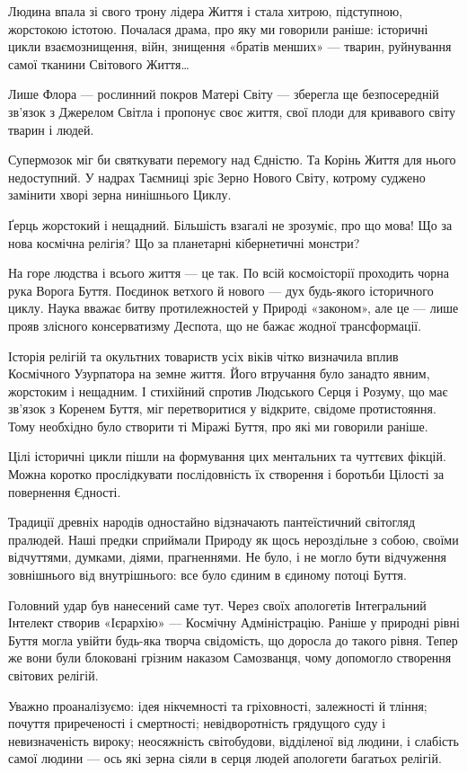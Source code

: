 Людина впала зі свого трону лідера Життя і стала хитрою, підступною, жорстокою
істотою. Почалася драма, про яку ми говорили раніше: історичні цикли
взаємознищення, війн, знищення «братів менших» — тварин, руйнування самої
тканини Світового Життя…

Лише Флора — рослинний покров Матері Світу — зберегла ще безпосередній зв’язок
з Джерелом Світла і пропонує своє життя, свої плоди для кривавого світу тварин
і людей.

Супермозок міг би святкувати перемогу над Єдністю. Та Корінь Життя для нього
недоступний. У надрах Таємниці зріє Зерно Нового Світу, котрому суджено
замінити хворі зерна нинішнього Циклу.

Ґерць жорстокий і нещадний. Більшість взагалі не зрозуміє, про що мова! Що за
нова космічна релігія? Що за планетарні кібернетичні монстри?

На горе людства і всього життя — це так. По всій космоісторії проходить чорна
рука Ворога Буття. Поєдинок ветхого й нового — дух будь-якого історичного
циклу. Наука вважає битву протилежностей у Природі «законом», але це — лише
прояв злісного консерватизму Деспота, що не бажає жодної трансформації.

Історія релігій та окультних товариств усіх віків чітко визначила вплив
Космічного Узурпатора на земне життя. Його втручання було занадто явним,
жорстоким і нещадним. І стихійний спротив Людського Серця і Розуму, що має
зв’язок з Коренем Буття, міг перетворитися у відкрите, свідоме протистояння.
Тому необхідно було створити ті Міражі Буття, про які ми говорили раніше.

Цілі історичні цикли пішли на формування цих ментальних та чуттєвих фікцій.
Можна коротко прослідкувати послідовність їх створення і боротьби Цілості за
повернення Єдності.

Традиції древніх народів одностайно відзначають пантеїстичний світогляд
пралюдей. Наші предки сприймали Природу як щось нероздільне з собою, своїми
відчуттями, думками, діями, прагненнями. Не було, і не могло бути відчуження
зовнішнього від внутрішнього: все було єдиним в єдиному потоці Буття.

Головний удар був нанесений саме тут. Через своїх апологетів Інтегральний
Інтелект створив «Ієрархію» — Космічну Адміністрацію. Раніше у природні рівні
Буття могла увійти будь-яка творча свідомість, що доросла до такого рівня.
Тепер же вони були блоковані грізним наказом Самозванця, чому допомогло
створення світових релігій.

Уважно проаналізуємо: ідея нікчемності та гріховності, залежності й тління;
почуття приреченості і смертності; невідворотність грядущого суду і
невизначеність вироку; неосяжність світобудови, відділеної від людини, і
слабість самої людини — ось які зерна сіяли в серця людей апологети багатьох
релігій.

